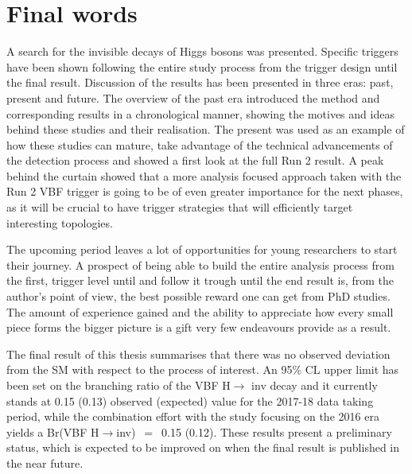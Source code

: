 \section{Final words}
\hspace{10pt} A search for the invisible decays of Higgs bosons was presented. Specific triggers have been shown following the entire study process from the trigger design until the final result. Discussion of the results has been presented in three eras: past, present and future. The overview of the past era introduced the method and corresponding results in a chronological manner, showing the motives and ideas behind these studies and their realisation. The present was used as an example of how these studies can mature, take advantage of the technical advancements of the detection process and showed a first look at the full Run 2 result. A peak behind the curtain showed that a more analysis focused approach taken with the Run 2 VBF trigger is going to be of even greater importance  for the next phases, as it will be crucial to have trigger strategies that will efficiently target interesting topologies.

\hspace{10pt} The upcoming period leaves a lot of opportunities for young researchers to start their journey. A prospect of being able to build the entire analysis process from the first, trigger level until and follow it trough until the end result is, from the author's point of view, the best possible reward one can get from PhD studies. The amount of experience gained and the ability to appreciate how every small piece forms the bigger picture is a gift very few endeavours provide as a result.

\hspace{10pt} The final result of this thesis summarises that there was no observed deviation from the SM with respect to the process of interest. An 95\% CL upper limit has been set on the branching ratio of the VBF H$\rightarrow$ inv decay and it currently stands at 0.15 (0.13) observed (expected) value for the 2017-18 data taking period, while the combination effort with the study focusing on the 2016 era yields a Br(VBF H$\rightarrow$inv)~$=$~0.15 (0.12). These results present a preliminary status, which is expected to be improved on when the final result is published in the near future.


\begin{center}
    \expandafter\pgfornament\expandafter{88}
\end{center}
\restoregeometry
